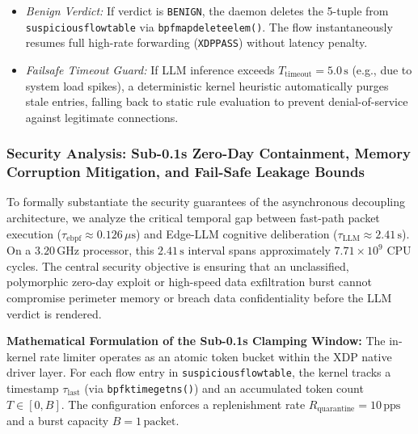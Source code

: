 \documentclass{ieeeaccess}
\renewcommand{\_}{\textunderscore\allowbreak}
\begin{document}
\begin{enumerate}
\begin{itemize}
    \item \textit{Benign Verdict:} If verdict is \texttt{BENIGN}, the daemon deletes the 5-tuple from \texttt{suspicious\_flow\_table} via \texttt{bpf\_map\_delete\_elem()}. The flow instantaneously resumes full high-rate forwarding (\texttt{XDP\_PASS}) without latency penalty.
    \item \textit{Failsafe Timeout Guard:} If LLM inference exceeds $T_{\text{timeout}} = 5.0\,\text{s}$ (e.g., due to system load spikes), a deterministic kernel heuristic automatically purges stale entries, falling back to static rule evaluation to prevent denial-of-service against legitimate connections.
  \end{itemize}
\end{enumerate}

\subsubsection{Security Analysis: Sub-0.1s Zero-Day Containment, Memory Corruption Mitigation, and Fail-Safe Leakage Bounds}
To formally substantiate the security guarantees of the asynchronous decoupling architecture, we analyze the critical temporal gap between fast-path packet execution ($\tau_{\text{ebpf}} \approx 0.126\,\mu\text{s}$) and Edge-LLM cognitive deliberation ($\tau_{\text{LLM}} \approx 2.41\,\text{s}$). On a $3.20\,\text{GHz}$ processor, this $2.41\,\text{s}$ interval spans approximately $7.71 \times 10^9$ CPU cycles. The central security objective is ensuring that an unclassified, polymorphic zero-day exploit or high-speed data exfiltration burst cannot compromise perimeter memory or breach data confidentiality before the LLM verdict is rendered.

\textbf{Mathematical Formulation of the Sub-0.1s Clamping Window:}
The in-kernel rate limiter operates as an atomic token bucket within the XDP native driver layer. For each flow entry in \texttt{suspicious\_flow\_table}, the kernel tracks a timestamp $\tau_{\text{last}}$ (via \texttt{bpf\_ktime\_get\_ns()}) and an accumulated token count $T \in [0, B]$. The configuration enforces a replenishment rate $R_{\text{quarantine}} = 10\,\text{pps}$ and a burst capacity $B = 1\,\text{packet}$.
\end{document}
